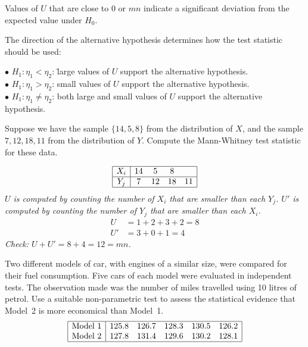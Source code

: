 \begin{remark}
Values of $U$ that are close to $0$ or $mn$ indicate a significant deviation from the expected value under $H_0$.

The direction of the alternative hypothesis determines how the test statistic should be used:
\begin{tabbing}
$\bullet$ $H_1:\eta_1 < \eta_2$:			\= large values of $U$ support the alternative hypothesis. \\
$\bullet$ $H_1:\eta_1 > \eta_2$:			\> small values of $U$ support the alternative hypothesis. \\
$\bullet$ $H_1:\eta_1 \neq \eta_2$:\qquad\qquad 	\> both large and small values of $U$ support the alternative hypothesis.
\end{tabbing}
\end{remark}

\begin{example}
Suppose we have the sample $\{14,5,8\}$ from the distribution of $X$, and the sample $7,12,18,11$ from the distribution of $Y$. Compute the Mann-Whitney test statistic for these data.
\end{example}

\begin{solution}
\[\begin{array}{|c|cccc|}\hline
X_i		& 14		&  5		&  8		& \\ \hline
Y_j		&  7		& 12		& 18		& 11 \\ \hline 
\end{array}\]
\bit 
\it $U$ is computed by counting the number of $X_i$ that are smaller than each $Y_j$.
\it $U'$ is computed by counting the number of $Y_j$ that are smaller than each $X_i$.
\eit
\begin{align*}
U 	& = 1 + 2 + 3 + 2 = 8 \\
U'	& = 3 + 0 + 1 = 4
\end{align*}
Check: $U+U' = 8 + 4 = 12 = mn$.
\end{solution}


\begin{example}\label{ex:mannwhitney}
Two different models of car, with engines of a similar size, were compared for their fuel consumption. Five cars of each model were evaluated in independent tests. The observation made was the number of miles travelled using 10 litres of petrol. Use a suitable non-parametric test to assess the statistical evidence that Model~2 is more economical than Model~1.
\[\begin{array}{|l|ccccc|}\hline
\text{Model 1}	& 125.8	& 126.7	& 128.3	& 130.5	& 126.2 \\
\text{Model 2}	& 127.8 & 131.4	& 129.6	& 130.2	& 128.1 \\ \hline
\end{array}\]
\end{example}

